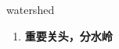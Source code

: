 
\begin{frame}
{\huge watershed}
\begin{center}
\begin{enumerate}\Large
  \item \textbf{重要关头，分水岭}
\end{enumerate}
\end{center}
\end{frame}
